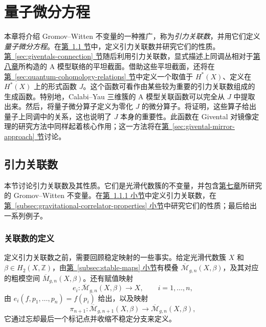 \chapter{量子微分方程}\label{chap:quantum-differential-equations}
本章将介绍 Gromov--Witten 不变量的一种推广，称为\emph{引力关联数}，并用它们定义\emph{量子微分方程}。在\hyperref[sec:gravitational-correlators]{第~\ref*{sec:gravitational-correlators} 节}中，定义引力关联数并研究它们的性质。\hyperref[sec:giventals-connection]{第~\ref*{sec:giventals-connection} 节}随后利用引力关联数，显式描述上同调丛相对于\hyperref[chap:quantum-cohomology]{第八章}所构造的 A 模型联络的平坦截面。借助这些平坦截面，还将在\hyperref[sec:quantum-cohomology-relations]{第~\ref*{sec:quantum-cohomology-relations} 节}中定义一个取值于 $H^*(X)$、定义在 $H^*(X)$ 上的形式函数 $J$。这个函数可看作由某些较为重要的引力关联数组成的生成函数。特别地，Calabi--Yau 三维簇的 A 模型关联函数可以完全从 $J$ 中提取出来。然后，将量子微分算子定义为零化 $J$ 的微分算子。将证明，这些算子给出量子上同调中的关系，这也说明了 $J$ 本身的重要性。此函数在 Givental 对镜像定理的研究方法中同样起着核心作用；这一方法将在\hyperref[sec:givental-mirror-approach]{第~\ref*{sec:givental-mirror-approach} 节}讨论。

\section{引力关联数}\label{sec:gravitational-correlators}
本节讨论引力关联数及其性质。它们是光滑代数簇的不变量，并包含\hyperref[chap:gromov-witten]{第七章}所研究的 Gromov--Witten 不变量。在\hyperref[subsec:gravitational-correlator-definition]{第~\ref*{subsec:gravitational-correlator-definition} 小节}中定义引力关联数，在\hyperref[subsec:gravitational-correlator-properties]{第~\ref*{subsec:gravitational-correlator-properties} 小节}中研究它们的性质；最后给出一系列例子。

\subsection{关联数的定义}\label{subsec:gravitational-correlator-definition}
定义引力关联数之前，需要回顾稳定映射的一些事实。给定光滑代数簇 $X$ 和 $\beta\in H_2(X,\mathbb Z)$，由\hyperref[subsec:stable-maps]{第~\ref*{subsec:stable-maps} 小节}有模叠 $\overline{\mathcal M}_{g,n}(X,\beta)$，及其对应的粗模空间 $\overline M_{g,n}(X,\beta)$。还有赋值映射
\[
e_i:\overline{\mathcal M}_{g,n}(X,\beta)\longrightarrow X,
\qquad i=1,\ldots,n,
\]
由 $e_i(f,p_1,\ldots,p_n)=f(p_i)$ 给出，以及映射
\[
\pi_{n+1}:\overline{\mathcal M}_{g,n+1}(X,\beta)
\longrightarrow\overline{\mathcal M}_{g,n}(X,\beta),
\]
它通过忘却最后一个标记点并收缩不稳定分支来定义。

